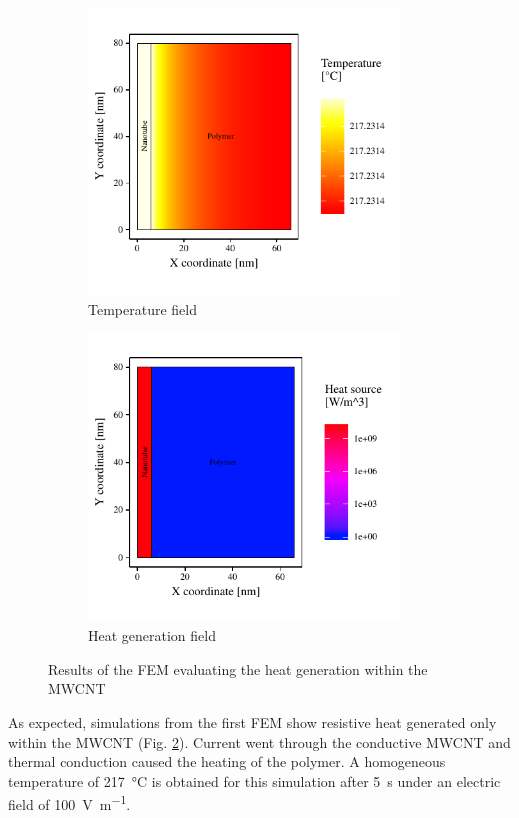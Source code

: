 \documentclass[11pt,review,times]{elsarticle}
\begin{document}
\begin{figure}[htb]
	\centering
	\captionsetup{width=125mm}
	\begin{subfigure}{60mm}
		\centering
		\captionsetup{width=75mm}
		\includegraphics[width=3.25in]{resultats_comsol_axisymetrique_temp}
		\caption{Temperature field}
		\label{fig:temp_axysymmetric}
	\end{subfigure}
	\begin{subfigure}{80mm}
		\centering
		\captionsetup{width=75mm}
		\includegraphics[width=3.25in]{resultats_comsol_axisymetrique_puissance}
		\caption{Heat generation field}
		\label{fig:heat_axysymmetric}
	\end{subfigure}%
	\caption{Results of the FEM evaluating the heat generation within the MWCNT}
	\label{fig:results_axysymmetric}
\end{figure}

As expected, simulations from the first FEM show resistive heat generated only within the MWCNT (Fig. \ref{fig:heat_axysymmetric}). 
Current went through the conductive MWCNT and thermal conduction caused the heating of the polymer. 
A homogeneous temperature of \SI{217}{\celsius} is obtained for this simulation after \SI{5}{\second} under an electric field of \SI{100}{\volt\per\metre}. 
\end{document}
